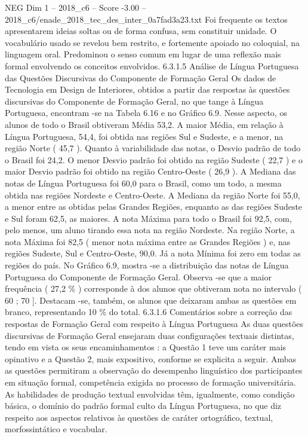 \begin{textsample}{NEG Dim 1 – 2018\_c6 – Score -3.00 – 2018\_c6/enade\_2018\_tec\_des\_inter\_0a7fad3a23.txt}
Foi frequente os textos apresentarem ideias soltas ou de forma confusa, sem constituir unidade.
O vocabulário usado se revelou bem restrito, e fortemente apoiado no coloquial, na linguagem oral.
Predominou o senso comum em lugar de uma reflexão mais formal envolvendo os conceitos envolvidos. 6.3.1.5 Análise de Língua Portuguesa das Questões Discursivas do Componente de Formação Geral Os dados de Tecnologia em Design de Interiores, obtidos a partir das respostas às questões discursivas do Componente de Formação Geral, no que tange à Língua Portuguesa, encontram -se na Tabela 6.16 e no Gráfico 6.9.
Nesse aspecto, os alunos de todo o Brasil obtiveram Média 53,2.
A maior Média, em relação à Língua Portuguesa, 54,4, foi obtida nas regiões Sul e Sudeste, e a menor, na região Norte ( 45,7 ).
Quanto à variabilidade das notas, o Desvio padrão de todo o Brasil foi 24,2.
O menor Desvio padrão foi obtido na região Sudeste ( 22,7 ) e o maior Desvio padrão foi obtido na região Centro-Oeste ( 26,9 ).
A Mediana das notas de Língua Portuguesa foi 60,0 para o Brasil, como um todo, a mesma obtida nas regiões Nordeste e Centro-Oeste.
A Mediana da região Norte foi 55,0, a menor entre as obtidas pelas Grandes Regiões, enquanto as das regiões Sudeste e Sul foram 62,5, as maiores.
A nota Máxima para todo o Brasil foi 92,5, com, pelo menos, um aluno tirando essa nota na região Nordeste.
Na região Norte, a nota Máxima foi 82,5 ( menor nota máxima entre as Grandes Regiões ) e, nas regiões Sudeste, Sul e Centro-Oeste, 90,0.
Já a nota Mínima foi zero em todas as regiões do país.
No Gráfico 6.9, mostra -se a distribuição das notas de Língua Portuguesa do Componente de Formação Geral.
Observa -se que a maior frequência ( 27,2 \% ) corresponde à dos alunos que obtiveram nota no intervalo ( 60 ; 70 ].
Destacam -se, também, os alunos que deixaram ambas as questões em branco, representando 10 \% do total. 6.3.1.6 Comentários sobre a correção das respostas de Formação Geral com respeito à Língua Portuguesa As duas questões discursivas de Formação Geral ensejaram duas configurações textuais distintas, tendo em vista os seus encaminhamentos : a Questão 1 teve um caráter mais opinativo e a Questão 2, mais expositivo, conforme se explicita a seguir.
Ambas as questões permitiram a observação do desempenho linguístico dos participantes em situação formal, competência exigida no processo de formação universitária.
As habilidades de produção textual envolvidas têm, igualmente, como condição básica, o domínio do padrão formal culto da Língua Portuguesa, no que diz respeito aos aspectos relativos às questões de caráter ortográfico, textual, morfossintático e vocabular.

\end{textsample}
